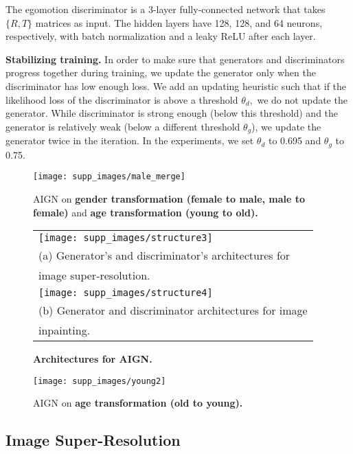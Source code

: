 \documentclass[10pt,twocolumn,letterpaper]{article}
\newcommand\todo[1]{\textcolor{red}{#1}}
\begin{document}
\begin{bibunit}[ieee]
\begin{appendices}
The egomotion discriminator is a 3-layer fully-connected network that takes $\{R,T\}$ matrices as input. The hidden layers have 128, 128, and 64 neurons, respectively, with batch normalization and a leaky ReLU after each layer.

\textbf{Stabilizing training.} 
In order to  make sure that generators and discriminators progress together during training, we update the generator  only when the discriminator has low enough loss. We add an updating heuristic such that if the likelihood loss of the discriminator is above a threshold $\theta_d,$ we do not update the generator. While discriminator is strong enough (below this threshold) and the generator is relatively weak (below a different threshold $\theta_g$), we update the generator twice %
in the iteration. 
In the experiments, we set $\theta_d$ to 0.695 and $\theta_g$ to 0.75.

\begin{figure*}[t]
    \centering
    \texttt{[image: supp\_images/male\_merge]}
     \centering
    \caption{AIGN on \textbf{gender transformation (female to male, male to female)} and \textbf{age transformation (young to old).}}
    \label{fig:more-male-merge}
\end{figure*}\begin{figure}[t]
    \begin{tabular}{l}
    \texttt{[image: supp\_images/structure3]} \\
    (a) Generator's and discriminator's architectures for  \\image super-resolution. \\
    \texttt{[image: supp\_images/structure4]} \\
    (b) Generator and discriminator architectures for image  \\inpainting. \\
    \end{tabular}
\centering
    \caption{\textbf{Architectures for AIGN.}}
    \label{fig:architectures}
\end{figure}\begin{figure}[t]
    \centering
    \texttt{[image: supp\_images/young2]}
     \centering
    \caption{AIGN on \textbf{age transformation (old to young).}}
    \label{fig:more-young}
\end{figure}\subsection{Image Super-Resolution}


\end{appendices}
\end{bibunit}
\end{document}
